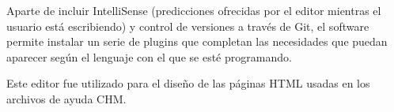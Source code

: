 Aparte de incluir IntelliSense (predicciones ofrecidas por el editor mientras el usuario está escribiendo) y control de versiones a través de Git, el software permite instalar un serie de plugins que completan las necesidades que puedan aparecer según el lenguaje con el que se esté programando.

Este editor fue utilizado para el diseño de las páginas HTML usadas en los archivos de ayuda CHM.